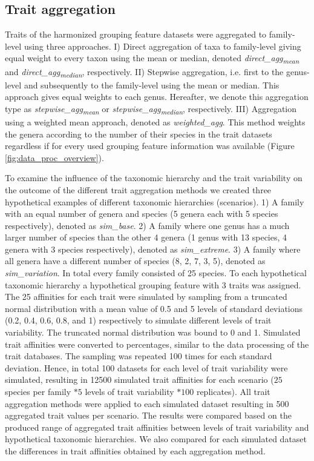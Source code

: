 \documentclass{article}
\begin{document}

\subsection*{Trait aggregation}

Traits of the harmonized grouping feature datasets were aggregated to family-level using three approaches. I) Direct aggregation of taxa to family-level giving equal weight to every taxon using the mean or median, denoted \textit{direct\_agg\textsubscript{mean}} and \textit{direct\_agg\textsubscript{median}}, respectively. II) Stepwise aggregation, i.e. first to the genus-level and subsequently to the family-level using the mean or median. This approach gives equal weights to each genus. Hereafter, we denote this aggregation type as \textit{stepwise\_agg\textsubscript{mean}} or \textit{stepwise\_agg\textsubscript{median}}, respectively. III) Aggregation using a weighted mean approach, denoted as \textit{weighted\_agg}. This method weights the genera according to the number of their species in the trait datasets regardless if for every used grouping feature information was available (Figure \ref{fig:data_proc_overview}). 

To examine the influence of the taxonomic hierarchy and the trait variability on the outcome of the different trait aggregation methods we created three hypothetical examples of different taxonomic hierarchies (scenarios). 
1) A family with an equal number of genera and species (5 genera each with 5 species respectively), denoted as \textit{sim\_base}.
2) A family where one genus has a much larger number of species than the other 4 genera (1 genus with 13 species, 4 genera with 3 species respectively), denoted as \textit{sim\_extreme}. 
3) A family where all genera have a different number of species (8, 2, 7, 3, 5), denoted as \textit{sim\_variation}. In total every family consisted of 25 species. To each hypothetical taxonomic hierarchy a hypothetical grouping feature with 3 traits was assigned. The 25 affinities for each trait were simulated by sampling from a truncated normal distribution with a mean value of 0.5 and 5 levels of standard deviations (0.2, 0.4, 0.6, 0.8, and 1) respectively to simulate different levels of trait variability. The truncated normal distribution was bound to 0 and 1. Simulated trait affinities were converted to percentages, similar to the data processing of the trait databases. The sampling was repeated 100 times for each standard deviation. Hence, in total 100 datasets for each level of trait variability were simulated, resulting in 12500 simulated trait affinities for each scenario ($25$ species per family $* 5$ levels of trait variability $* 100$ replicates). All trait aggregation methods were applied to each simulated dataset resulting in 500 aggregated trait values per scenario. The results were compared based on the produced range of aggregated trait affinities between levels of trait variability and hypothetical taxonomic hierarchies. We also compared for each simulated dataset the differences in trait affinities obtained by each aggregation method.  
\end{document}
